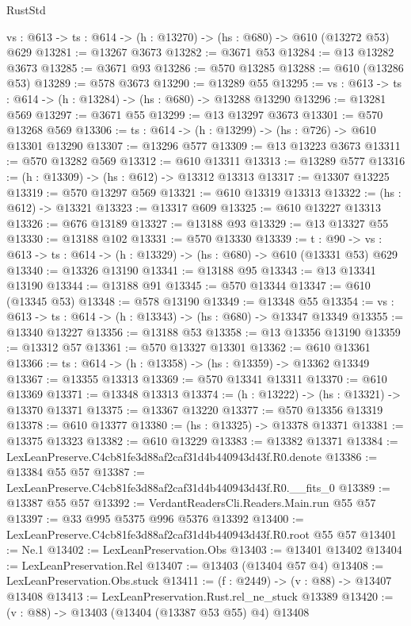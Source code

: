 \begin{lexlean}{RustStd}
\begin{coremodule}
  {vs : @613} -> {ts : @614} -> (h : @13270) -> (hs : @680) -> @610 (@13272 @53) @629
@13281 := @13267 @3673
@13282 := @3671 @53
@13284 := @13 @13282 @3673
@13285 := @3671 @93
@13286 := @570 @13285
@13288 := @610 (@13286 @53)
@13289 := @578 @3673
@13290 := @13289 @55
@13295 := {vs : @613} -> {ts : @614} -> (h : @13284) -> (hs : @680) -> @13288 @13290
@13296 := @13281 @569
@13297 := @3671 @55
@13299 := @13 @13297 @3673
@13301 := @570 @13268 @569
@13306 := {ts : @614} -> (h : @13299) -> (hs : @726) -> @610 @13301 @13290
@13307 := @13296 @577
@13309 := @13 @13223 @3673
@13311 := @570 @13282 @569
@13312 := @610 @13311
@13313 := @13289 @577
@13316 := (h : @13309) -> (hs : @612) -> @13312 @13313
@13317 := @13307 @13225
@13319 := @570 @13297 @569
@13321 := @610 @13319 @13313
@13322 := (hs : @612) -> @13321
@13323 := @13317 @609
@13325 := @610 @13227 @13313
@13326 := @676 @13189
@13327 := @13188 @93
@13329 := @13 @13327 @55
@13330 := @13188 @102
@13331 := @570 @13330
@13339 := {t : @90} ->
  {vs : @613} -> {ts : @614} -> (h : @13329) -> (hs : @680) -> @610 (@13331 @53) @629
@13340 := @13326 @13190
@13341 := @13188 @95
@13343 := @13 @13341 @13190
@13344 := @13188 @91
@13345 := @570 @13344
@13347 := @610 (@13345 @53)
@13348 := @578 @13190
@13349 := @13348 @55
@13354 := {vs : @613} -> {ts : @614} -> (h : @13343) -> (hs : @680) -> @13347 @13349
@13355 := @13340 @13227
@13356 := @13188 @53
@13358 := @13 @13356 @13190
@13359 := @13312 @57
@13361 := @570 @13327 @13301
@13362 := @610 @13361
@13366 := {ts : @614} -> (h : @13358) -> (hs : @13359) -> @13362 @13349
@13367 := @13355 @13313
@13369 := @570 @13341 @13311
@13370 := @610 @13369
@13371 := @13348 @13313
@13374 := (h : @13222) -> (hs : @13321) -> @13370 @13371
@13375 := @13367 @13220
@13377 := @570 @13356 @13319
@13378 := @610 @13377
@13380 := (hs : @13325) -> @13378 @13371
@13381 := @13375 @13323
@13382 := @610 @13229
@13383 := @13382 @13371
@13384 := LexLeanPreserve.C4cb81fe3d88af2caf31d4b440943d43f.R0.denote
@13386 := @13384 @55 @57
@13387 := LexLeanPreserve.C4cb81fe3d88af2caf31d4b440943d43f.R0.__fits_0
@13389 := @13387 @55 @57
@13392 := VerdantReadersCli.Readers.Main.run @55 @57
@13397 := @33 @995 @5375 @996 @5376 @13392
@13400 := LexLeanPreserve.C4cb81fe3d88af2caf31d4b440943d43f.R0.root @55 @57
@13401 := Ne.{1}
@13402 := LexLeanPreservation.Obs
@13403 := @13401 @13402
@13404 := LexLeanPreservation.Rel
@13407 := @13403 (@13404 @57 @4)
@13408 := LexLeanPreservation.Obs.stuck
@13411 := (f : @2449) -> (v : @88) -> @13407 @13408
@13413 := LexLeanPreservation.Rust.rel_ne_stuck @13389
@13420 := (v : @88) -> @13403 (@13404 (@13387 @53 @55) @4) @13408

\end{coremodule}
\end{lexlean}
